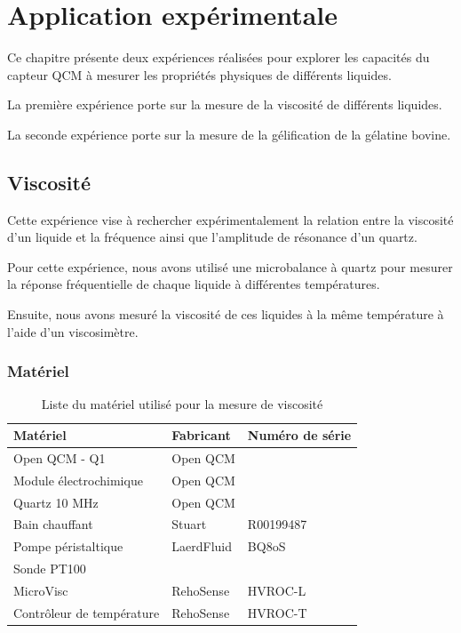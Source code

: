 \chapter{Application expérimentale}

Ce chapitre présente deux expériences réalisées pour explorer les capacités du capteur QCM à mesurer les propriétés physiques de différents liquides.

La première expérience porte sur la mesure de la viscosité de différents liquides.

La seconde expérience porte sur la mesure de la gélification de la gélatine bovine.


\section{Viscosité}

Cette expérience vise à rechercher expérimentalement la relation entre la viscosité d'un liquide et la fréquence ainsi que l'amplitude de résonance d'un quartz.

Pour cette expérience, nous avons utilisé une microbalance à quartz pour mesurer la réponse fréquentielle de chaque liquide à différentes températures.

Ensuite, nous avons mesuré la viscosité de ces liquides à la même température à l'aide d'un viscosimètre.

\subsection{Matériel}
 
\begin{table}[H]
    \centering
    \begin{tabular}{|l|l|l|}
        \hline
        \textbf{Matériel}         & \textbf{Fabricant}   & \textbf{Numéro de série} \\
        \hline
        Open QCM - Q1            & Open QCM              &   \\
        Module électrochimique   & Open QCM              &   \\
        Quartz 10 MHz            & Open QCM              &   \\
        Bain chauffant          & Stuart                & R00199487 \\
        Pompe péristaltique     & LaerdFluid            & BQ8oS     \\
        Sonde PT100             &                       &   \\
        MicroVisc               & RehoSense             & HVROC-L   \\
        Contrôleur de température & RehoSense           & HVROC-T   \\
        \hline
    \end{tabular}
    \caption{Liste du matériel utilisé pour la mesure de viscosité}
\end{table}

